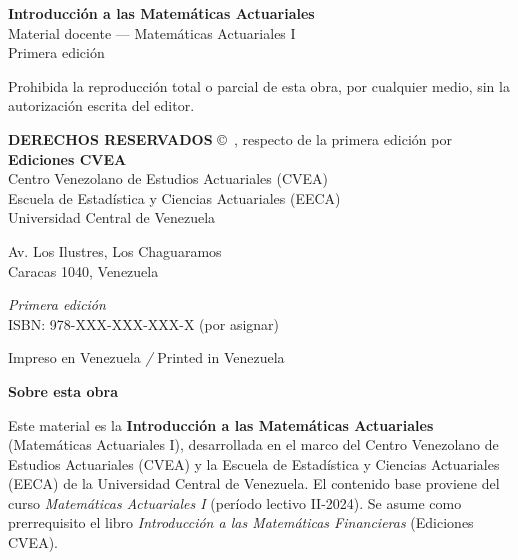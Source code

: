 \thispagestyle{empty}
\vspace*{1.5cm}
\begin{center}
\textbf{Introducción a las Matemáticas Actuariales}\\
Material docente --- Matemáticas Actuariales I\\[1cm]
Primera edición\\[2cm]
\end{center}

Prohibida la reproducción total o parcial de esta obra, por cualquier medio, sin la autorización escrita del editor.

\vspace{1em}
\textbf{DERECHOS RESERVADOS} \copyright\ \the\year, respecto de la primera edición por\\
\textbf{Ediciones CVEA}\\
Centro Venezolano de Estudios Actuariales (CVEA)\\
Escuela de Estadística y Ciencias Actuariales (EECA)\\
Universidad Central de Venezuela

\vspace{0.8em}
Av. Los Ilustres, Los Chaguaramos\\
Caracas 1040, Venezuela

\vspace{0.5em}
\textit{Primera edición}\\
ISBN: 978-XXX-XXX-XXX-X (por asignar)

\vspace{1em}
\small
Impreso en Venezuela \textit{/} Printed in Venezuela

\vfill
\newpage

\thispagestyle{empty}
\vspace*{1.2cm}
\begin{center}
{\LARGE\bfseries Sobre esta obra}
\end{center}
\vspace{1.2cm}

Este material es la \textbf{Introducción a las Matemáticas Actuariales} (Matemáticas Actuariales I), desarrollada en el marco del Centro Venezolano de Estudios Actuariales (CVEA) y la Escuela de Estadística y Ciencias Actuariales (EECA) de la Universidad Central de Venezuela. El contenido base proviene del curso \textit{Matemáticas Actuariales I} (período lectivo II-2024). Se asume como prerrequisito el libro \textit{Introducción a las Matemáticas Financieras} (Ediciones CVEA).

